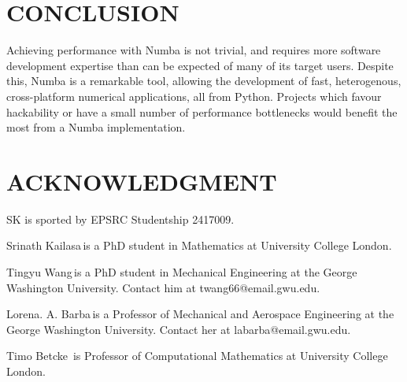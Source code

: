 \documentclass{IEEEcsmag}
\begin{document}
\section{CONCLUSION}

Achieving performance with Numba is not trivial, and requires more software development expertise than can be expected of many of its target users. Despite this, Numba is a remarkable tool, allowing the development of fast, heterogenous, cross-platform numerical applications, all from Python. Projects which favour hackability or have a small number of performance bottlenecks would benefit the most from a Numba implementation.

\section{ACKNOWLEDGMENT}

SK is sported by EPSRC Studentship 2417009.





\begin{IEEEbiography}{Srinath Kailasa}{\,}is a PhD student in Mathematics at University College London.
\end{IEEEbiography}

\begin{IEEEbiography}{Tingyu Wang}{\,}is a PhD student in Mechanical Engineering at the George Washington University. Contact him at twang66@email.gwu.edu.
\end{IEEEbiography}

\begin{IEEEbiography}{Lorena. A. Barba}{\,}is a Professor of Mechanical and Aerospace Engineering at the George Washington University.  Contact her at labarba@email.gwu.edu.
\end{IEEEbiography}

\begin{IEEEbiography}{Timo Betcke}{\,} is Professor of Computational Mathematics at University College London.
\end{IEEEbiography}
\end{document}
